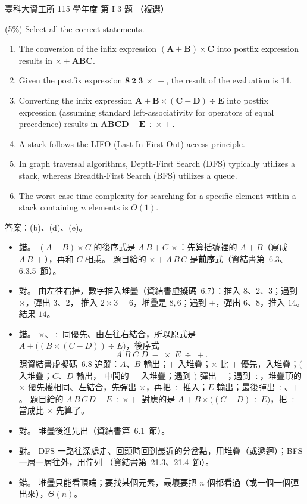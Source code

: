 \begin{pastexam}[label={px:ntust-115-ice-03}]{臺科大資工所 115 學年度 第 I-3 題}
（複選）

(5\%) Select all the correct statements.
\begin{enumerate}[label=(\alph*)]
\item The conversion of the infix expression $(\boldsymbol{A}+\boldsymbol{B})\times \boldsymbol{C}$ into
postfix expression results in $\times +\boldsymbol{ABC}$.
\item Given the postfix expression $\mathbf{8\ 2\ 3}\ \times\ +$, the result of the evaluation is $14$.
\item Converting the infix expression $\boldsymbol{A}+\boldsymbol{B}\times(\boldsymbol{C}-\boldsymbol{D})\div
\boldsymbol{E}$ into postfix expression (assuming standard left-associativity for operators of equal
precedence) results in $\boldsymbol{ABCD}-\boldsymbol{E}\div\times+$.
\item A stack follows the LIFO (Last-In-First-Out) access principle.
\item In graph traversal algorithms, Depth-First Search (DFS) typically utilizes a stack, whereas
Breadth-First Search (BFS) utilizes a queue.
\item The worst-case time complexity for searching for a specific element within a stack containing $n$
elements is $O(1)$.
\end{enumerate}
\end{pastexam}

\begin{pastsoln}
答案：(b)、(d)、(e)。

\begin{itemize}
\item[(a)] 錯。 $(A + B) \times C$ 的後序式是 $A\,B + C\,\times$：先算括號裡的 $A + B$（寫成 $A\,B\,+$），再和 $C$
相乘。 題目給的 $\times + A\,B\,C$ 是\textbf{前序}式（資結書第~6.3、6.3.5~節）。
\item[(b)] 對。 由左往右掃，數字推入堆疊（資結書虛擬碼~6.7）：推入 $8$、$2$、$3$；遇到 $\times$，彈出 $3$、$2$，
推入 $2 \times 3 = 6$，堆疊是 $8, 6$；遇到 $+$，彈出 $6$、$8$，推入 $14$。 結果 $14$。
\item[(c)] 錯。 $\times$、$\div$ 同優先、由左往右結合，所以原式是 $A + \bigl((B \times (C - D)) \div E\bigr)$，後序式
\[
A\;B\;C\;D\;-\;\times\;E\;\div\;+ .
\]
照資結書虛擬碼~6.8 追蹤：$A$、$B$ 輸出；$+$ 入堆疊；$\times$ 比 $+$ 優先，入堆疊；$($ 入堆疊；$C$、$D$ 輸出，
中間的 $-$ 入堆疊；遇到 $)$ 彈出 $-$；遇到 $\div$，堆疊頂的 $\times$ 優先權相同、左結合，先彈出 $\times$，再把
$\div$ 推入；$E$ 輸出；最後彈出 $\div$、$+$。 題目給的 $A\,B\,C\,D - E \div \times +$ 對應的是
$A + B \times \bigl((C - D) \div E\bigr)$，把 $\div$ 當成比 $\times$ 先算了。
\item[(d)] 對。 堆疊後進先出（資結書第~6.1~節）。
\item[(e)] 對。 DFS 一路往深處走、回頭時回到最近的分岔點，用堆疊（或遞迴）；BFS 一層一層往外，用佇列
（資結書第~21.3、21.4~節）。
\item[(f)] 錯。 堆疊只能看頂端；要找某個元素，最壞要把 $n$ 個都看過（或一個一個彈出來），$\Theta(n)$。
\end{itemize}
\end{pastsoln}
